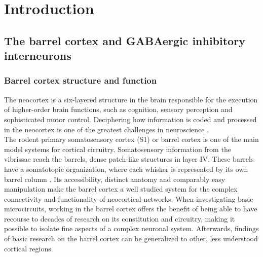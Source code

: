 \chapter{Introduction}
\label{ch:intro}
\acresetall
\section{The barrel cortex and GABAergic inhibitory interneurons}
\label{sec:GABA neurons}
\subsection{Barrel cortex structure and function}
\label{subsec:bcx1}
The neocortex is a six-layered structure in the brain responsible for the execution of higher-order brain functions, such as cognition, sensory perception and sophisticated motor control. Deciphering how information is coded and processed in the neocortex is one of the greatest challenges in neuroscience \citep{Lui2011,Lodato2016}.\\
The rodent primary somatosensory cortex (S1) or barrel cortex is one of the main model systems for cortical circuitry. Somatosensory information from the vibrissae reach the barrels, dense patch-like structures in layer IV. These barrels have a somatotopic organization, where each whisker is represented by its own barrel column \citep{Feldmeyer2013a, Petersen2013a}. Its accessibility, distinct anatomy and comparably easy manipulation make the barrel cortex a well studied system for the complex connectivity and functionality of neocortical networks. When investigating basic microcircuits, working in the barrel cortex offers the benefit of being able to have recourse to decades of research on its constitution and circuitry, making it possible to isolate fine aspects of a complex neuronal system. Afterwards, findings of basic research on the barrel cortex can be generalized to other, less understood cortical regions.
